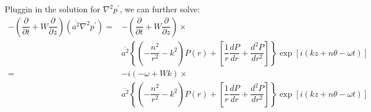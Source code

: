 \documentclass[onecolumn,10pt]{jhwhw}
\begin{document}
Pluggin in the solution for $\nabla^2 p^{\prime}$, we can further solve:
\begin{align*}
- \left ( \dfrac{\partial}{\partial t} + W \dfrac{\partial}{\partial z} \right) \left ( \overline{a^2} \nabla^2 p^{\prime} \right ) =& - \left ( \dfrac{\partial}{\partial t} + W \dfrac{\partial}{\partial z} \right) \times \\
& \overline{a^2} \left \{ \left ( -\dfrac{n^2}{r^2} -k^2 \right ) P(r) + \left [ \dfrac{1}{r} \dfrac{d P} {d r} + \dfrac{d^2 P} {d r^2} \right ] \right \} \exp[i(kz+n \theta - \omega t)] \\
=& -i \left( - \omega + W k \right) \times \\
& \overline{a^2} \left \{ \left ( -\dfrac{n^2}{r^2} -k^2 \right ) P(r) + \left [ \dfrac{1}{r} \dfrac{d P} {d r} + \dfrac{d^2 P} {d r^2} \right ] \right \} \exp[i(kz+n \theta - \omega t)] \\
\end{align*}
\end{document}
